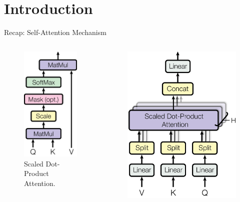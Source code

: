 \section{Introduction}

\begin{frame}{Recap: Self-Attention Mechanism}
    \begin{columns}
        \begin{column}{0.5\textwidth}
            \begin{figure}
                \centering
                \includegraphics[height=0.75\textwidth]{pic/ModalNet-19}
                \caption{
                Scaled Dot-Product Attention.
                }
                \label{fig:doprod}
            \end{figure}
        \end{column}
        \begin{column}{0.5\textwidth}
            \begin{figure}
                \centering
                \includegraphics[height=0.75\textwidth]{pic/ModalNet-32}

\end{figure}
\end{column}
\end{columns}
\end{frame}
